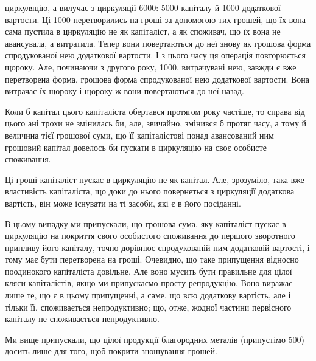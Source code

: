 \parcont{}  %
циркуляцію, а вилучає з циркуляції 6000: 5000 капіталу й
1000 додаткової вартости. Ці 1000 перетворились на
гроші за допомогою тих грошей, що їх вона сама пустила в циркуляцію
не як капіталіст, а як споживач, що їх вона не авансувала, а витратила.
Тепер вони повертаються до неї знову як грошова форма спродукованої
нею додаткової вартости. І з цього часу ця операція повторюється
щороку. Але, починаючи з другого року, 1000, витрачувані нею,
завжди є вже перетворена форма, грошова форма спродукованої нею
додаткової вартости. Вона витрачає їх щороку і щороку ж вони повертаються
до неї назад.

Коли б капітал цього капіталіста обертався протягом року частіше,
то справа від цього ані трохи не змінилась би, але, звичайно, змінився
б протяг часу, а тому й величина тієї грошової суми, що її капіталістові
понад авансований ним грошовий капітал довелось би пускати в
циркуляцію на своє особисте споживання.

Ці гроші капіталіст пускає в циркуляцію не як капітал. Але, зрозуміло,
така вже властивість капіталіста, що доки до нього повернеться з
циркуляції додаткова вартість, він може існувати на ті засоби, які є в
його посіданні.

В цьому випадку ми припускали, що грошова сума, яку капіталіст
пускає в циркуляцію на покриття свого особистого споживання до першого
зворотного припливу його капіталу, точно дорівнює спродукованій ним
додатковій вартості, і тому має бути перетворена на гроші. Очевидно,
що таке припущення відносно поодинокого капіталіста довільне. Але
воно мусить бути правильне для цілої кляси капіталістів, якщо ми
припускаємо просту репродукцію. Воно виражає лише те, що є в цьому
припущенні, а саме, що всю додаткову вартість, але і тільки її, споживається
непродуктивно; що, отже, жодної частини первісного капіталу
не споживається непродуктивно.

Ми вище припускали, що цілої продукції благородних металів
(припустімо \deq{} 500) досить лише для того, щоб покрити зношування
грошей.

